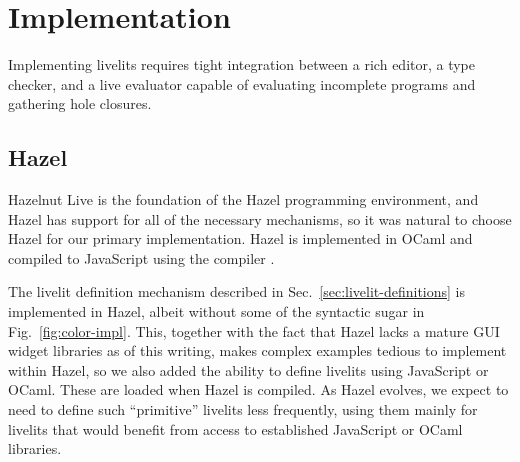 \section{Implementation}\label{sec:implementation}
Implementing livelits requires tight integration between a rich editor, 
a type checker, and a live evaluator 
capable of evaluating incomplete programs and gathering hole closures.

\subsection{Hazel}
Hazelnut Live is the foundation of the Hazel programming environment, 
and Hazel has support for all of the necessary mechanisms, so 
it was natural to choose Hazel for our primary implementation.
Hazel is implemented in OCaml and compiled to JavaScript using the  compiler \cite{DBLP:conf/aplas/RadanneVB16}.

The livelit definition mechanism described in Sec.~\ref{sec:livelit-definitions}
is implemented in Hazel, albeit without some of the syntactic sugar in Fig.~\ref{fig:color-impl}.
This, together with the fact that Hazel lacks a mature GUI widget libraries as of this writing, 
makes complex examples tedious to implement within Hazel, so we also 
added the ability to define livelits using JavaScript or OCaml. These are loaded when 
Hazel is compiled. As Hazel evolves, we expect to need to define such ``primitive'' livelits less 
frequently, using them mainly for livelits that would benefit from access to established JavaScript 
or OCaml libraries.

